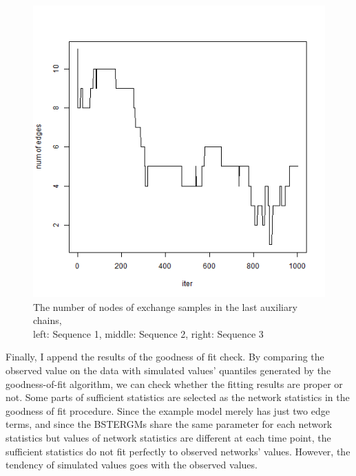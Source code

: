 \documentclass[a4paper, 11pt]{report}
\theoremstyle{definition}
\begin{document}
\begin{figure}[h]
\begin{center}
        \includegraphics[scale=0.26]{pictures/net3seq_chain1_lastsampler_num_edges.png}
    \caption{The number of nodes of exchange samples in the last auxiliary chains,\\left: Sequence 1, middle: Sequence 2, right: Sequence 3}
    \end{center}
\end{figure}


Finally, I append the results of the goodness of fit check.
By comparing the observed value on the data with simulated values' quantiles generated by the goodness-of-fit algorithm,
we can check whether the fitting results are proper or not.
Some parts of sufficient statistics are selected as the network statistics in the goodness of fit procedure.
Since the example model merely has just two edge terms, 
and since the BSTERGMs share the same parameter for each network statistics but values of network statistics are different at each time point, 
the sufficient statistics do not fit perfectly to observed networks' values. 
However, the tendency of simulated values goes with the observed values.
\end{document}
